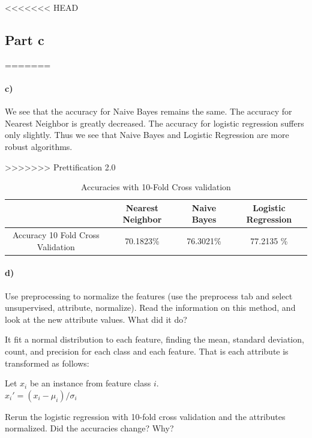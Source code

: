 \documentclass{article}
\begin{document}
\begin{table}[H]
\begin{table}[H]
<<<<<<< HEAD
\subsection{Part c}
\begin{table}[H]
=======

\paragraph{c)}We see that the accuracy for Naive Bayes remains the same. The accuracy for Nearest Neighbor is greatly decreased. The accuracy for logistic regression suffers only slightly. Thus we see that Naive Bayes and Logistic Regression are more robust algorithms. 

\begin{table}[ht]
>>>>>>> Prettification 2.0
    \begin{center}
     \caption{Accuracies with 10-Fold Cross validation}
    \begin{tabular}{|c|c|c|c|}
   \hline
        & Nearest Neighbor & Naive Bayes & Logistic Regression \\ \hline
         Accuracy 10 Fold Cross Validation &  70.1823\%&76.3021\% &  77.2135 \%   \\ \hline
       
             
     
    \end{tabular}
    \end{center}
\end{table}



\paragraph{d)}
Use preprocessing to normalize the features (use the preprocess tab and select unsupervised, attribute, normalize). Read the information on this method, and look at the new attribute values. What did it do?

It fit a normal distribution to each feature, finding the mean, standard deviation, count, and precision for each class and each feature. That is each attribute is transformed as follows: 
\begin{center}
Let $x_i$ be an instance from feature class $i$. \\
$x_i' = (x_i-\mu_i)/\sigma_i$
\end{center}

Rerun the logistic regression with 10-fold cross validation and the attributes normalized. Did the accuracies change? Why?


\end{table}
\end{table}
\end{table}
\end{document}
